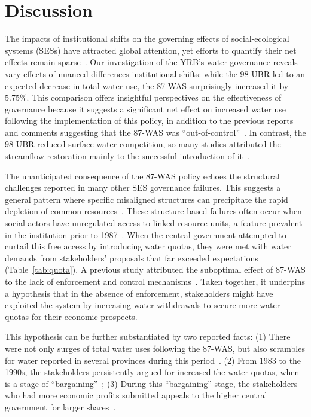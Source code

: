 \documentclass[preprint, 12pt]{elsarticle}
\begin{document}
\section{Discussion}\label{sec:discussion}


The impacts of institutional shifts on the governing effects of social-ecological systems (SESs) have attracted global attention, yet efforts to quantify their net effects remain sparse~\cite{cumming2020a}.
Our investigation of the YRB's water governance reveals vary effects of nuanced-differences institutional shifts: while the 98-UBR led to an expected decrease in total water use, the 87-WAS surprisingly increased it by $5.75\%$.
This comparison offers insightful perspectives on the effectiveness of governance because it suggests a significant net effect on increased water use following the implementation of this policy, in addition to the previous reports and comments suggesting that the 87-WAS was ``out-of-control''~\cite{wang2019d, departmentofearthsciences1999}.
In contrast, the 98-UBR reduced surface water competition, so many studies attributed the streamflow restoration mainly to the successful introduction of it~\cite{chen2021,huangang2002,an2007}.

The unanticipated consequence of the 87-WAS policy echoes the structural challenges reported in many other SES governance failures.
This suggests a general pattern where specific misaligned structures can precipitate the rapid depletion of common resources~\cite{kellenberg2009,cai2016,barnes2019}.
These structure-based failures often occur when social actors have unregulated access to linked resource units, a feature prevalent in the institution prior to 1987~\cite{wang2019c}.
When the central government attempted to curtail this free access by introducing water quotas, they were met with water demands from stakeholders' proposals that far exceeded expectations (Table~\ref{tab:quota}).
A previous study attributed the suboptimal effect of 87-WAS to the lack of enforcement and control mechanisms~\cite{huangang2002}.
Taken together, it underpins a hypothesis that in the absence of enforcement, stakeholders might have exploited the system by increasing water withdrawals to secure more water quotas for their economic prospects.

This hypothesis can be further substantiated by two reported facts:
(1) There were not only surges of total water uses following the 87-WAS, but also scrambles for water reported in several provinces during this period~\cite{mao2000, bouckaert2022}.
(2) From 1983 to the 1990s, the stakeholders persistently argued for increased the water quotas, when is a stage of ``bargaining''~\cite{wang2019e, wang2019d};
(3) During this ``bargaining'' stage, the stakeholders who had more economic profits submitted appeals to the higher central government for larger shares~\cite{wang2019e, wang2019d}.
\end{document}
